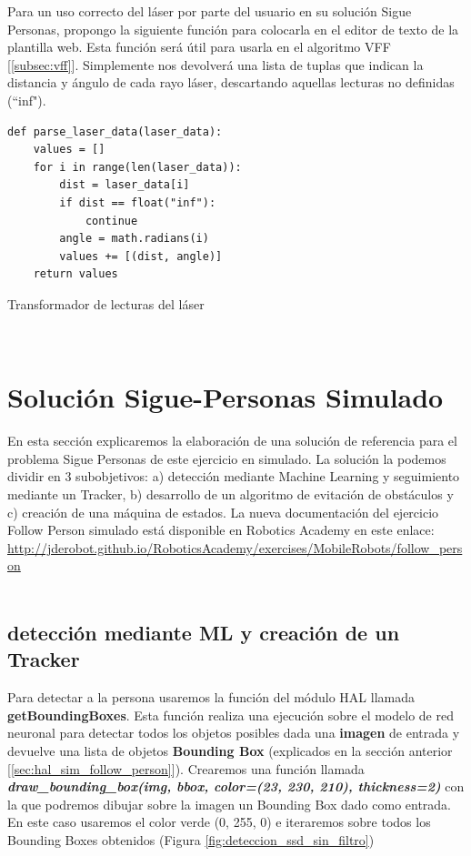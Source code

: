 Para un uso correcto del láser por parte del usuario en su solución Sigue Personas, propongo la siguiente función para colocarla en el editor de texto de la plantilla web. Esta función será útil para usarla en el algoritmo VFF [\ref{subsec:vff}]. Simplemente nos devolverá una lista de tuplas que indican la distancia y ángulo de cada rayo láser, descartando aquellas lecturas no definidas (``inf").\\

\begin{code}[H]
\begin{lstlisting}
def parse_laser_data(laser_data):
    values = []
    for i in range(len(laser_data)):
        dist = laser_data[i]
        if dist == float("inf"):
            continue
        angle = math.radians(i)
        values += [(dist, angle)]
    return values
\end{lstlisting}
\caption[Transformador de lecturas del láser]{Transformador de lecturas del láser}
\label{cod:parse_laser_data}
\end{code}\




\section{Solución Sigue-Personas Simulado}
\label{sec:sigue_personas_simulado}

En esta sección explicaremos la elaboración de una solución de referencia para el problema Sigue Personas de este ejercicio en simulado. La solución la podemos dividir en 3 subobjetivos: a) detección mediante Machine Learning y seguimiento mediante un Tracker, b) desarrollo de un algoritmo de evitación de obstáculos y c) creación de una máquina de estados. La nueva documentación del ejercicio Follow Person simulado está disponible en Robotics Academy en este enlace: \url{http://jderobot.github.io/RoboticsAcademy/exercises/MobileRobots/follow_person}\\\\




\subsection{detección mediante ML y creación de un Tracker}
\label{subsec:ml_tracker}
Para detectar a la persona usaremos la función del módulo HAL llamada \textbf{getBoundingBoxes}. Esta función realiza una ejecución sobre el modelo de red neuronal para detectar todos los objetos posibles dada una \textbf{imagen} de entrada y devuelve una lista de objetos \textbf{Bounding Box} (explicados en la sección anterior [\ref{sec:hal_sim_follow_person}]). Crearemos una función llamada \textbf{\textit{draw\_bounding\_box(img, bbox, color=(23, 230, 210), thickness=2)}} con la que podremos dibujar sobre la imagen un Bounding Box dado como entrada. En este caso usaremos el color verde (0, 255, 0) e iteraremos sobre todos los Bounding Boxes obtenidos (Figura \ref{fig:deteccion_ssd_sin_filtro})\\

